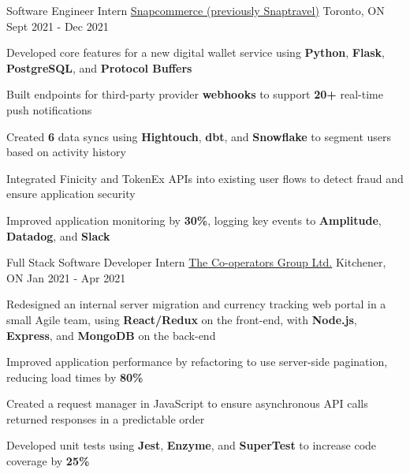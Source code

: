 
\begin{cventries}
  \cventry
    {Software Engineer Intern} %
    {\href{https://www.snapcommerce.com/}{Snapcommerce (previously Snaptravel)}} %
    {Toronto, ON} %
    {Sept 2021 - Dec 2021} %
    {
      \begin{cvitems} %
      \item {Developed core features for a new digital wallet service using \textbf{Python}, \textbf{Flask}, \textbf{PostgreSQL}, and \textbf{Protocol Buffers}}
      \item {Built endpoints for third-party provider \textbf{webhooks} to support \textbf{20+} real-time push notifications}
      \item {Created \textbf{6} data syncs using \textbf{Hightouch}, \textbf{dbt}, and \textbf{Snowflake} to segment users based on activity history}
      \item {Integrated Finicity and TokenEx APIs into existing user flows to detect fraud and ensure application security}
      \item {Improved application monitoring by \textbf{30\%}, logging key events to \textbf{Amplitude}, \textbf{Datadog}, and \textbf{Slack}}
      \end{cvitems}
    }

  \cventry
    {Full Stack Software Developer Intern} %
    {\href{https://www.cooperators.ca/}{The Co-operators Group Ltd.}} %
    {Kitchener, ON} %
    {Jan 2021 - Apr 2021} %
    {
      \begin{cvitems} %
      \item {Redesigned an internal server migration and currency tracking web portal in a small Agile team, using \textbf{React/Redux} on the front-end, with \textbf{Node.js}, \textbf{Express}, and \textbf{MongoDB} on the back-end}
      \item {Improved application performance by refactoring to use server-side pagination, reducing load times by \textbf{80\%}}
      \item {Created a request manager in JavaScript to ensure asynchronous API calls returned responses in a predictable order}
      \item {Developed unit tests using \textbf{Jest}, \textbf{Enzyme}, and \textbf{SuperTest} to increase code coverage by \textbf{25\%}}
      \end{cvitems}
    }
    

\end{cventries}
